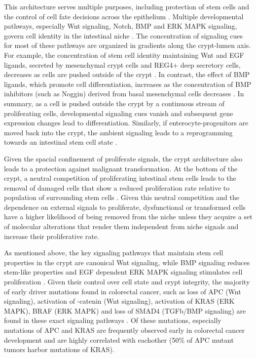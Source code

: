 \begin{flushleft}
This architecture serves multiple purposes, including protection of stem cells and the control of cell fate decisions across the epithelium \cite{cleversIntestinalCryptPrototype2013a}. Multiple developmental pathways, especially Wnt signaling, Notch, BMP and ERK MAPK signaling, govern cell identity in the intestinal niche \cite{Gehart2019}. The concentration of signaling cues for most of these pathways are organized in gradients along the crypt-lumen axis. For example, the concentration of stem cell identity maintaining Wnt and EGF ligands, secreted by mesenchymal crypt cells and REG4+ deep secretory cells, decreases as cells are pushed outside of the crypt  \cite{Sasaki2016}. In contrast, the effect of BMP ligands, which promote cell differentiation, increases as the concentration of BMP inhibitors (such as Noggin) derived from basal mesenchymal cells decreases \cite{heBMPSignalingInhibits2004}. In summary, as a cell is pushed outside the crypt by a continuous stream of proliferating cells, developmental signaling cues vanish and subsequent gene expression changes lead to differentiation. Similarly, if enterocyte-progenitors are moved back into the crypt, the ambient signaling leads to a reprogramming towards an intestinal stem cell state \cite{tettehReplacementLostLgr5Positive2016a}. \par

Given the spacial confinement of proliferate signals, the crypt architecture also leads to a protection against malignant transformation. At the bottom of the crypt, a neutral competition of proliferating intestinal stem cells leads to the removal of damaged cells that show a reduced proliferation rate relative to population of surrounding stem cells \cite{snippertIntestinalCryptHomeostasis2010a}. Given this neutral competition and the dependence on external signals to proliferate, dysfunctional or transformed cells have a higher likelihood of being removed from the niche unless they acquire a set of molecular alterations that render them independent from niche signals and increase their proliferative rate. \par

As mentioned above, the key signaling pathways that maintain stem cell properties in the crypt are canonical Wnt signaling, while BMP signaling reduces stem-like properties and EGF dependent ERK MAPK signaling stimulates cell proliferation \cite{cleversIntestinalCryptPrototype2013a}. Given their control over cell state and crypt integrity, the majority of early driver mutations found in colorectal cancer, such as loss of APC (Wnt signaling), activation of \textbeta-catenin (Wnt signaling), activation of KRAS (ERK MAPK), BRAF (ERK MAPK) and loss of SMAD4 (TGFb/BMP signaling) are found in these exact signaling pathways \cite{fearonMolecularGeneticsColorectal2011}. Of these mutations, especially mutations of APC and KRAS are frequently observed early in colorectal cancer development and are highly correlated with eachother (50\% of APC mutant tumors harbor mutations of KRAS). \par


\end{flushleft}
